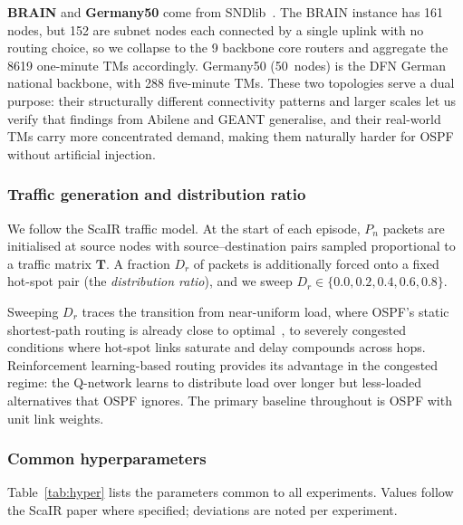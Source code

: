 \documentclass[10pt,twocolumn,letterpaper]{article}
\begin{document}
\textbf{BRAIN} and \textbf{Germany50} come from
SNDlib~\cite{sndlib}. The BRAIN instance has 161 nodes, but 152 are
subnet nodes each connected by a single uplink with no routing choice,
so we collapse to the 9 backbone core routers and aggregate the 8619
one-minute TMs accordingly. Germany50 (50~nodes) is the DFN German
national backbone, with 288 five-minute TMs. These two topologies serve
a dual purpose: their structurally different connectivity patterns and
larger scales let us verify that findings from Abilene and GEANT
generalise, and their real-world TMs carry more concentrated demand,
making them naturally harder for OSPF without artificial injection.

\subsubsection{Traffic generation and distribution ratio}

We follow the ScaIR traffic model. At the start of each episode, $P_n$
packets are initialised at source nodes with source--destination pairs
sampled proportional to a traffic matrix $\mathbf{T}$. A fraction $D_r$
of packets is additionally forced onto a fixed hot-spot pair (the
\emph{distribution ratio}), and we sweep $D_r \in \{0.0, 0.2, 0.4,
0.6, 0.8\}$.

Sweeping $D_r$ traces the transition from near-uniform load, where
OSPF's static shortest-path routing is already close to
optimal~\cite{scair2025}, to severely congested conditions where
hot-spot links saturate and delay compounds across hops. Reinforcement
learning-based routing provides its advantage in the congested regime:
the Q-network learns to distribute load over longer but less-loaded
alternatives that OSPF ignores. The primary baseline throughout is OSPF
with unit link weights.

\subsubsection{Common hyperparameters}

Table~\ref{tab:hyper} lists the parameters common to all experiments.
Values follow the ScaIR paper where specified; deviations are noted per
experiment.
\end{document}
